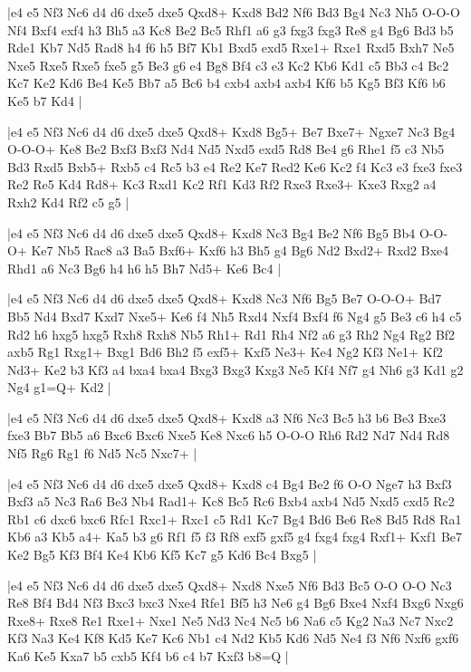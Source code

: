 \whitename{}
\blackname{}
\makegametitle
|e4 e5 Nf3 Nc6 d4 d6 dxe5 dxe5 Qxd8+ Kxd8 Bd2 Nf6 Bd3 Bg4 Nc3 Nh5 O-O-O Nf4 Bxf4 exf4 h3 Bh5 a3 Kc8 Be2 Bc5 Rhf1 a6 g3 fxg3 fxg3 Re8 g4 Bg6 Bd3 b5 Rde1 Kb7 Nd5 Rad8 h4 f6 h5 Bf7 Kb1 Bxd5 exd5 Rxe1+ Rxe1 Rxd5 Bxh7 Ne5 Nxe5 Rxe5 Rxe5 fxe5 g5 Be3 g6 e4 Bg8 Bf4 c3 e3 Kc2 Kb6 Kd1 c5 Bb3 c4 Bc2 Kc7 Ke2 Kd6 Be4 Ke5 Bb7 a5 Bc6 b4 cxb4 axb4 axb4 Kf6 b5 Kg5 Bf3 Kf6 b6 Ke5 b7 Kd4  |

\whitename{}
\blackname{}
\makegametitle
|e4 e5 Nf3 Nc6 d4 d6 dxe5 dxe5 Qxd8+ Kxd8 Bg5+ Be7 Bxe7+ Ngxe7 Nc3 Bg4 O-O-O+ Ke8 Be2 Bxf3 Bxf3 Nd4 Nd5 Nxd5 exd5 Rd8 Be4 g6 Rhe1 f5 c3 Nb5 Bd3 Rxd5 Bxb5+ Rxb5 c4 Rc5 b3 e4 Re2 Ke7 Red2 Ke6 Kc2 f4 Kc3 e3 fxe3 fxe3 Re2 Re5 Kd4 Rd8+ Kc3 Rxd1 Kc2 Rf1 Kd3 Rf2 Rxe3 Rxe3+ Kxe3 Rxg2 a4 Rxh2 Kd4 Rf2 c5 g5  |

\whitename{}
\blackname{}
\makegametitle
|e4 e5 Nf3 Nc6 d4 d6 dxe5 dxe5 Qxd8+ Kxd8 Nc3 Bg4 Be2 Nf6 Bg5 Bb4 O-O-O+ Ke7 Nb5 Rac8 a3 Ba5 Bxf6+ Kxf6 h3 Bh5 g4 Bg6 Nd2 Bxd2+ Rxd2 Bxe4 Rhd1 a6 Nc3 Bg6 h4 h6 h5 Bh7 Nd5+ Ke6 Bc4  |

\whitename{}
\blackname{}
\makegametitle
|e4 e5 Nf3 Nc6 d4 d6 dxe5 dxe5 Qxd8+ Kxd8 Nc3 Nf6 Bg5 Be7 O-O-O+ Bd7 Bb5 Nd4 Bxd7 Kxd7 Nxe5+ Ke6 f4 Nh5 Rxd4 Nxf4 Bxf4 f6 Ng4 g5 Be3 c6 h4 c5 Rd2 h6 hxg5 hxg5 Rxh8 Rxh8 Nb5 Rh1+ Rd1 Rh4 Nf2 a6 g3 Rh2 Ng4 Rg2 Bf2 axb5 Rg1 Rxg1+ Bxg1 Bd6 Bh2 f5 exf5+ Kxf5 Ne3+ Ke4 Ng2 Kf3 Ne1+ Kf2 Nd3+ Ke2 b3 Kf3 a4 bxa4 bxa4 Bxg3 Bxg3 Kxg3 Ne5 Kf4 Nf7 g4 Nh6 g3 Kd1 g2 Ng4 g1=Q+ Kd2  |

\whitename{}
\blackname{}
\makegametitle
|e4 e5 Nf3 Nc6 d4 d6 dxe5 dxe5 Qxd8+ Kxd8 a3 Nf6 Nc3 Bc5 h3 b6 Be3 Bxe3 fxe3 Bb7 Bb5 a6 Bxc6 Bxc6 Nxe5 Ke8 Nxc6 h5 O-O-O Rh6 Rd2 Nd7 Nd4 Rd8 Nf5 Rg6 Rg1 f6 Nd5 Nc5 Nxc7+  |

\whitename{}
\blackname{}
\makegametitle
|e4 e5 Nf3 Nc6 d4 d6 dxe5 dxe5 Qxd8+ Kxd8 c4 Bg4 Be2 f6 O-O Nge7 h3 Bxf3 Bxf3 a5 Nc3 Ra6 Be3 Nb4 Rad1+ Kc8 Bc5 Rc6 Bxb4 axb4 Nd5 Nxd5 cxd5 Rc2 Rb1 c6 dxc6 bxc6 Rfc1 Rxc1+ Rxc1 c5 Rd1 Kc7 Bg4 Bd6 Be6 Re8 Bd5 Rd8 Ra1 Kb6 a3 Kb5 a4+ Ka5 b3 g6 Rf1 f5 f3 Rf8 exf5 gxf5 g4 fxg4 fxg4 Rxf1+ Kxf1 Be7 Ke2 Bg5 Kf3 Bf4 Ke4 Kb6 Kf5 Kc7 g5 Kd6 Bc4 Bxg5  |

\whitename{}
\blackname{}
\makegametitle
|e4 e5 Nf3 Nc6 d4 d6 dxe5 dxe5 Qxd8+ Nxd8 Nxe5 Nf6 Bd3 Bc5 O-O O-O Nc3 Re8 Bf4 Bd4 Nf3 Bxc3 bxc3 Nxe4 Rfe1 Bf5 h3 Ne6 g4 Bg6 Bxe4 Nxf4 Bxg6 Nxg6 Rxe8+ Rxe8 Re1 Rxe1+ Nxe1 Ne5 Nd3 Nc4 Nc5 b6 Na6 c5 Kg2 Na3 Nc7 Nxc2 Kf3 Na3 Ke4 Kf8 Kd5 Ke7 Kc6 Nb1 c4 Nd2 Kb5 Kd6 Nd5 Ne4 f3 Nf6 Nxf6 gxf6 Ka6 Ke5 Kxa7 b5 cxb5 Kf4 b6 c4 b7 Kxf3 b8=Q  |

